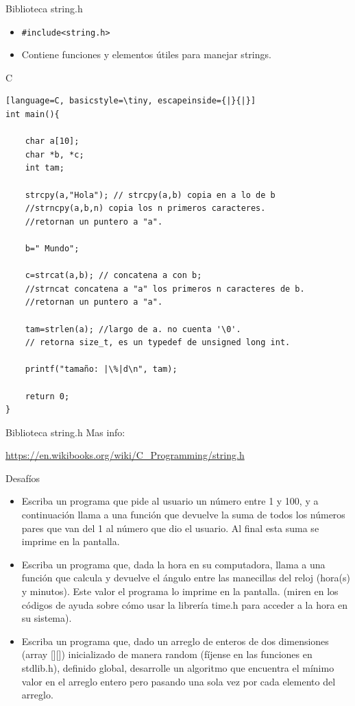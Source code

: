 \documentclass{beamer}
\begin{document}
\begin{frame}[fragile]{Biblioteca string.h}
\begin{itemize}
	\item \verb+#include<string.h>+
	\item Contiene funciones y elementos útiles para manejar strings.
\end{itemize}

\begin{exampleblock}{C}
\begin{lstlisting}[language=C, basicstyle=\tiny, escapeinside={|}{|}]
int main(){

	char a[10];
	char *b, *c;
	int tam;

	strcpy(a,"Hola"); // strcpy(a,b) copia en a lo de b
	//strncpy(a,b,n) copia los n primeros caracteres.
	//retornan un puntero a "a". 

	b=" Mundo";
	
	c=strcat(a,b); // concatena a con b;
	//strncat concatena a "a" los primeros n caracteres de b.
	//retornan un puntero a "a". 
	
	tam=strlen(a); //largo de a. no cuenta '\0'.
	// retorna size_t, es un typedef de unsigned long int.

	printf("tamaño: |\%|d\n", tam);

	return 0;
}

\end{lstlisting}
\end{exampleblock}
\end{frame}


\begin{frame}[fragile]{Biblioteca string.h}
Mas info:

{\centering\large \url{https://en.wikibooks.org/wiki/C_Programming/string.h}}

\end{frame}

\begin{frame}[fragile]{Desafíos}
\begin{itemize}
\item Escriba un programa que pide al usuario un número entre 1 y 100, y a continuación llama a una función que devuelve la suma de todos los números pares que van del 1 al número que dio el usuario. Al final esta suma se imprime en la pantalla.

\item Escriba un programa que, dada la hora en su computadora, llama a una función que calcula y devuelve el ángulo entre las manecillas del reloj (hora(s) y minutos). Este valor el programa lo imprime en la pantalla. (miren en los códigos de ayuda sobre cómo usar la librería time.h para acceder a la hora en su sistema).

\item Escriba un programa que, dado un arreglo de enteros de dos dimensiones (array [][]) inicializado de manera random (fíjense en las funciones en stdlib.h), definido global, desarrolle un algoritmo que encuentra el mínimo valor en el arreglo entero pero pasando una sola vez por cada elemento del arreglo.
\end{itemize}
\end{frame}
\end{document}
